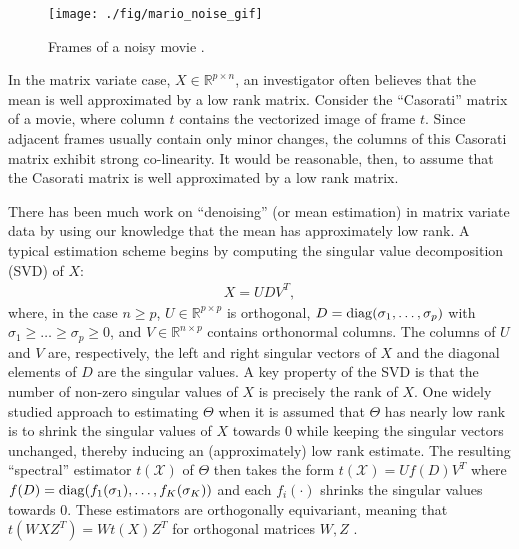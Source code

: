 \begin{figure*}
\begin{center}
\texttt{[image: ./fig/mario\_noise\_gif]}
\caption{Frames of a noisy movie \citep{marioimage}.}
\label{fig:mario.movie.noise}
\end{center}
\end{figure*}

 In the matrix variate case, $X \in \mathbb{R}^{p \times n}$, an investigator often believes that the mean is well approximated by a low rank matrix. Consider the ``Casorati'' matrix of a movie, where column $t$ contains the vectorized image of frame $t$. Since adjacent frames usually contain only minor changes, the columns of this Casorati matrix exhibit strong co-linearity. It would be reasonable, then, to assume that the Casorati matrix is well approximated by a low rank matrix.

 There has been much work on ``denoising'' (or mean estimation) in matrix variate data by using our knowledge that the mean has approximately low rank. A typical estimation scheme begins by computing the singular value decomposition (SVD) of $X$:
  \begin{align}
    \label{equation:svd}
    X = UDV^T,
  \end{align}
  where, in the case $n \geq p$, $U \in \mathbb{R}^{p \times p}$ is orthogonal, $D = \operatorname*{diag}(\sigma_1,\ldots,\sigma_p)$ with $\sigma_1 \geq \ldots\geq \sigma_p \geq 0$, and $V \in \mathbb{R}^{n \times p}$ contains orthonormal columns. The columns of $U$ and $V$ are, respectively, the left and right singular vectors of $X$ and the diagonal elements of $D$ are the singular values. A key property of the SVD is that the number of non-zero singular values of $X$ is precisely the rank of $X$. One widely studied approach to estimating $\Theta$ when it is assumed that $\Theta$ has nearly low rank is to shrink the singular values of $X$ towards $0$ while keeping the singular vectors unchanged, thereby inducing an (approximately) low rank estimate. The resulting ``spectral'' estimator $t(\mathcal{X})$ of $\Theta$ then takes the form $t(\mathcal{X}) = Uf(D)V^T$ where $f(D) = \operatorname*{diag}(f_1(\sigma_1),\ldots,f_K(\sigma_K))$ and each $f_i(\cdot)$ shrinks the singular values towards $0$. These estimators are orthogonally equivariant, meaning that $t(WXZ^T) = Wt(X)Z^T$ for orthogonal matrices $W,Z$ \citep{shabalin2013reconstruction}.

